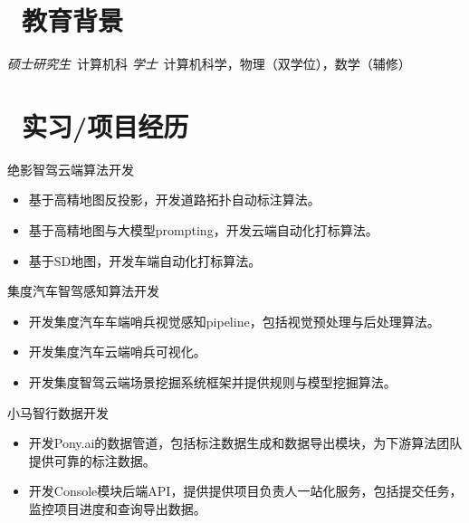 \documentclass{resume}
\begin{document}


 
\section{\faGraduationCap\  教育背景}
\textit{硕士研究生}\ 计算机科
\textit{学士}\ 计算机科学，物理（双学位），数学（辅修）

\section{\faUsers\ 实习/项目经历}
\role{高级算法工程师}{工作经历}
绝影智驾云端算法开发
\begin{itemize}
  \item 基于高精地图反投影，开发道路拓扑自动标注算法。
  \item 基于高精地图与大模型prompting，开发云端自动化打标算法。
  \item 基于SD地图，开发车端自动化打标算法。
\end{itemize}

集度汽车智驾感知算法开发
\begin{itemize}
  \item 开发集度汽车车端哨兵视觉感知pipeline，包括视觉预处理与后处理算法。
  \item 开发集度汽车云端哨兵可视化。
  \item 开发集度智驾云端场景挖掘系统框架并提供规则与模型挖掘算法。
\end{itemize}

小马智行数据开发
\begin{itemize}
  \item 开发Pony.ai的数据管道，包括标注数据生成和数据导出模块，为下游算法团队提供可靠的标注数据。
  \item 开发Console模块后端API，提供提供项目负责人一站化服务，包括提交任务，监控项目进度和查询导出数据。
\end{itemize}
\end{document}
